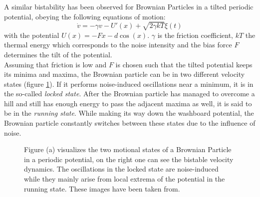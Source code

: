 \documentclass[12pt,a4paper]{article}
\begin{document}
A similar bistability has been observed for Brownian Particles in a tilted periodic potential, obeying the following equations of motion\cite{bpp}: 
\begin{equation*}
\dot{v}=-\gamma v-U'(x)+\sqrt{2\gamma kT}\xi(t)
\end{equation*}
with the potential $U(x)=-Fx-d\cos(x)$. $\gamma$ is the friction coefficient, $kT$ the thermal energy which corresponds to the noise intensity and the bias force $F$ determines the tilt of the potential.
\\
Assuming that friction is low and $F$ is chosen such that the tilted potential keeps its minima and maxima, the Brownian particle can be in two different velocity states (figure \ref{veldynintro}). If it performs noise-induced oscillations near a minimum, it is in the so-called \textit{locked state}. After the Brownian particle has managed to overcome a hill and still has enough energy to pass the adjacent maxima as well, it is said to be in the \textit{running state}. While making its way down the washboard potential, the Brownian particle constantly switches between these states due to the influence of noise.

\begin{figure}[H]
	\caption{Figure (a) visualizes the two motional states of a Brownian Particle in a periodic potential, on the right one can see the bistable velocity dynamics. The oscillations in the locked state are noise-induced while they mainly arise from local extrema of the potential in the running state. These images have been taken from\cite{bpp}.}
	\label{veldynintro} 
\end{figure}
\end{document}
